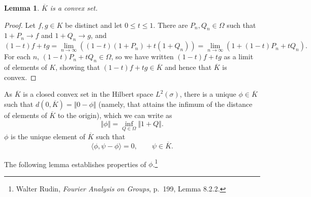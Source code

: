 \documentclass{article}
\newcommand{\inner}[2]{\langle #1, #2 \rangle}
\newcommand{\norm}[1]{\Vert #1 \Vert}
\newtheorem{lemma}[theorem]{Lemma}
\begin{document}
\begin{lemma}
$\overline{K}$ is a convex set.
\end{lemma}
\begin{proof}
Let $f,g \in K$ be distinct and let $0 \leq t \leq 1$. There are $P_n,Q_n \in \Omega$ such that
$1+P_n \to f$ and $1+Q_n \to g$, and 
\[
(1-t)f+tg = \lim_{n \to \infty} ((1-t)(1+P_n)+t(1+Q_n)) = 
\lim_{n \to \infty} (1+(1-t)P_n+tQ_n).
\]
For each $n$, $(1-t)P_n + tQ_n \in \Omega$, so we have written $(1-t)f+tg$ as a limit of elements of $K$, showing that
$(1-t)f+tg \in \overline{K}$ and hence that $\overline{K}$ is convex.
\end{proof}

As $\overline{K}$ is a closed convex set in the Hilbert space $L^2(\sigma)$, there is a unique $\phi \in \overline{K}$
such that $d(0,\overline{K}) = \norm{0-\phi}$ (namely, that attains the infimum of the distance of  elements of $\overline{K}$ to the origin), which
we can write as
\[
\norm{\phi} = \inf_{Q \in \Omega} \norm{1+Q}.
\]
$\phi$ is the unique element of $\overline{K}$ such that
\[
\inner{\phi}{\psi-\phi}=0, \qquad \psi \in \overline{K}.
\]

The following lemma establishes properties of $\phi$.\footnote{Walter Rudin, {\em Fourier Analysis on Groups},
p.~199, Lemma 8.2.2.}
\end{document}

